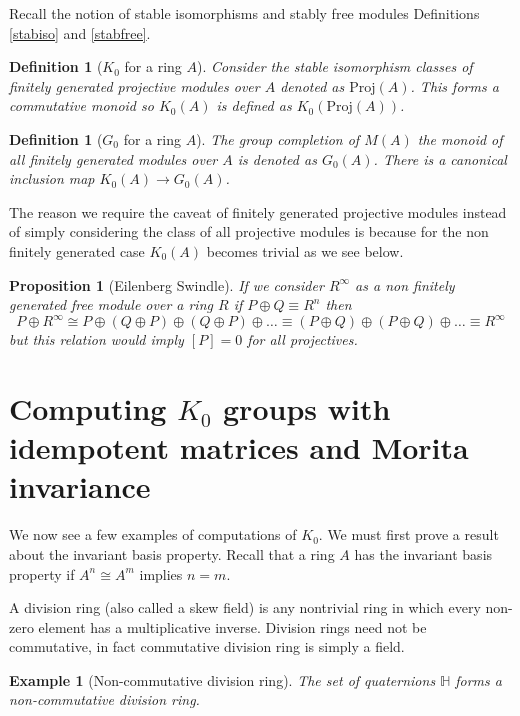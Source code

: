 \documentclass[12pt]{report}
\numberwithin{equation}{section}
\newcounter{dummy} \numberwithin{dummy}{section}
\newtheorem{definition}[dummy]{Definition}
\newtheorem{proposition}[dummy]{Proposition}
\newtheorem{example}[dummy]{Example}
\begin{document}
	Recall the notion of stable isomorphisms and stably free modules Definitions \ref{stabiso} and \ref{stabfree}.
	
	\begin{definition}[$K_0$ for a ring $A$]
		Consider the stable isomorphism classes of finitely generated projective modules over $A$ denoted as $\mathrm{Proj}(A)$. This forms a commutative monoid so $K_0(A)$ is defined as $K_0(\mathrm{Proj}(A))$.
	\end{definition}
	\begin{definition}[$G_0$ for a ring $A$]
	The group completion of $M(A) $ the monoid of all finitely generated modules over $A$ is denoted as $G_0(A) $. 	There is a canonical inclusion map $K_0(A) \to G_0(A)$.
	\end{definition}


The reason we require the caveat of finitely generated projective modules instead of simply considering the class of all projective modules is because for the non finitely generated case $K_0(A)$ becomes trivial as we see below.
	\begin{proposition}[Eilenberg Swindle] If we consider $R^\infty$ as a non finitely generated free module over a ring $R$ if $P \oplus Q \equiv R^n$ then \[ P \oplus R^\infty \cong P \oplus (Q \oplus P) \oplus (Q \oplus P) \oplus \dots \equiv (P \oplus Q) \oplus (P \oplus Q) \oplus \dots \equiv R^\infty \] but this relation would imply $[P]=0 $ for all projectives. 
	\end{proposition}
%	
%	

	\section{Computing $K_0$ groups with idempotent matrices and Morita invariance}\label{k0withidempotent}
	We now see a few examples of computations of $K_0$. We must first prove a result about the invariant basis property. Recall that a ring $A$ has the invariant basis property if $A^n \cong A^m $ implies $n = m$. 
	
	A division ring (also called a skew field) is any nontrivial ring in which every non-zero element has a multiplicative inverse. Division rings need not be commutative, in fact commutative division ring is simply a field.
	\begin{example}[Non-commutative division ring]
		The set of quaternions $\mathbb{H}$ forms a non-commutative division ring.
	\end{example}
	
\end{document}
